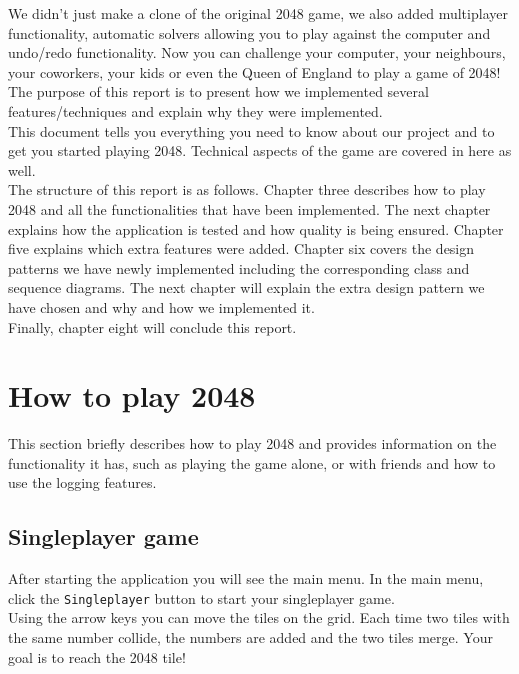 \documentclass[a4paper,11pt,report]{scrartcl}
\begin{document}
We didn't just make a clone of the original 2048 game, we also added
multiplayer functionality, automatic solvers allowing you to play against the computer and 
undo/redo functionality. 
Now you can challenge your computer, your neighbours, your
coworkers, your kids or even the Queen of England to play a game of 2048!\\

The purpose of this report is to present how we implemented several features/techniques and explain why they were implemented.\\
This document tells you everything you need to know about our project and to get you started playing 2048. Technical aspects of the game are covered in here as well.\\

 The structure of this report is as follows. Chapter three describes how to play 2048 and all the functionalities that have been implemented. The next chapter explains how the application is tested and how quality is being ensured. Chapter five explains which extra features were added. Chapter six covers the design patterns we have newly implemented including the corresponding class and sequence diagrams. The next chapter will explain the extra design pattern we have chosen and why and how we implemented it.\\
Finally, chapter eight will conclude this report. \\

\newpage\section{How to play 2048}

This section briefly describes how to play 2048 and provides information on
the functionality it has, such as playing the game alone, or with friends and how
to use the logging features.

\subsection{Singleplayer game}
After starting the application you will see the main menu. In the main menu,
click the \texttt{Singleplayer} button to start your singleplayer game.\\

Using the arrow keys you can move the tiles on the grid. Each time two tiles with the same
number collide, the numbers are added and the two tiles merge. Your goal is to
reach the 2048 tile!\\
\end{document}
